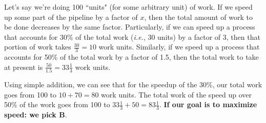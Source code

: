 \documentclass[fleqn]{article}
\begin{document}
\begin{solution}
Let's say we're doing 100 ``units" (for some arbitrary unit) of work. If we speed up some part of the pipeline by a factor of $x$, then the total amount of work to be done decreases by the same factor. Particularly, if we can speed up a process that accounts for 30\% of the total work (\textit{i.e.}, 30 units) by a factor of 3, then that portion of work takes $\frac{30}{3} = 10$ work units. Similarly, if we speed up a process that accounts for 50\% of the total work by a factor of 1.5, then the total work to take at present is $\frac{50}{1.5} = 33 \frac{1}{3}$ work units.

Using simple addition, we can see that for the speedup of the 30\%, our total work goes from 100 to $10 + 70 = 80$ work units. The total work of the speed up over 50\% of the work goes from 100 to $33\frac{1}{3} + 50 = 83 \frac{1}{3}$. \textbf{If our goal is to maximize speed: we pick B}.
\end{solution}
\end{document}

